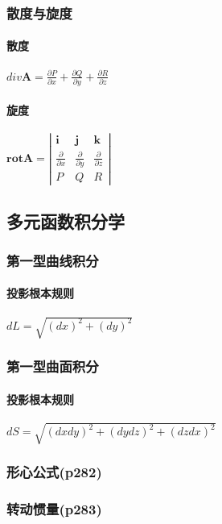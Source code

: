 ﻿\documentclass[a4paper,12pt,UTF8]{ctexart}
\begin{document}
    \subsubsection{散度与旋度}
    \paragraph{散度} \(div \mathbf{A} = \frac{\partial P}{\partial x} + \frac{\partial Q}{\partial y} + \frac{\partial R}{\partial z}\)
    \paragraph{旋度} \(\mathbf{rot} \mathbf{A} = 
    \left|\begin{array}{cccc}
        \mathbf{i}& \mathbf{j}& \mathbf{k}\\
        \frac{\partial}{\partial x}& \frac{\partial}{\partial y}& \frac{\partial}{\partial z}\\
        P& Q& R
    \end{array}\right|\)
    
    \subsection{多元函数积分学}
    
    \subsubsection{第一型曲线积分}
    \paragraph{投影根本规则} \(dL=\sqrt{(dx)^2+(dy)^2}\)
    
    \subsubsection{第一型曲面积分}
    \paragraph{投影根本规则} \(dS=\sqrt{(dxdy)^2+(dydz)^2+(dzdx)^2}\) 
    
    \subsubsection{形心公式(p282)}
    
    \subsubsection{转动惯量(p283)}
\end{document}
